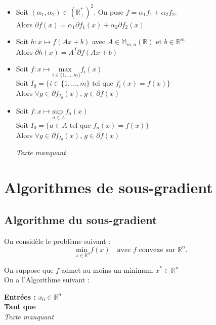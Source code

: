 \documentclass[12pt,a4paper]{article}
\newcommand{\propriete}[2]{%
    \begin{tcolorbox}[colback=white,colframe=green!25!white,title=\textbf{Propriété #1}, coltitle=black]
        #2
    \end{tcolorbox}
}
\begin{document}
\propriete{}{
    \begin{itemize}
        \item Soit $(\alpha_1, \alpha_2) \in (\mathbb{R}_+^*)^2$.
        On pose $f = \alpha_1 f_1 + \alpha_2 f_2$.\\
        Alors $\partial f(x) = \alpha_1 \partial f_1(x) + \alpha_2 \partial f_2(x)$
        \item Soit $h : x \mapsto f(Ax + b)$ avec $A \in \mathbb{M}_{m,n}(\mathbb{R})$ et $b \in \mathbb{R}^m$\\
        Alors $\partial h(x) = A^T \partial f(Ax + b)$
        \item Soit $f : x \mapsto \underset{i \in \{1, \dots, m\}}{\text{max }} f_i(x)$\\
        Soit $I_0 = \{i \in \{1, \dots, m\} \text{ tel que } f_i(x) = f(x)\}$\\
        Alors $\forall g \in \partial f_{I_0}(x)$, $g \in \partial f(x)$
        \item Soit $f : x \mapsto \underset{a \in A}{\text{sup }} f_a(x)$\\
        Soit $I_0 = \{a \in A \text{ tel que } f_a(x) = f(x)\}$\\
        Alors $\forall g \in \partial f_{I_0}(x)$, $g \in \partial f(x)$

        \textit{Texte manquant}\\
    \end{itemize}
}



\section{Algorithmes de sous-gradient}

\subsection{Algorithme du sous-gradient}

On considèle le problème suivant :\\
\begin{equation}
    \underset{x \in \mathbb{R}^n}{\text{min }} f(x) \quad \text{avec } f \text{ convexe sur } \mathbb{R}^n.
\end{equation}

On suppose que $f$ admet au moins un minimum $x^* \in \mathbb{R}^n$\\

On a l'Algorithme suivant :\\
\begin{algorithm}
    \SetAlgoLined
    \textbf{Entrées :} $x_0 \in \mathbb{R}^n$\\
    \textbf{Tant que}\\
    \textit{Texte manquant}\\
\end{algorithm}
\end{document}

